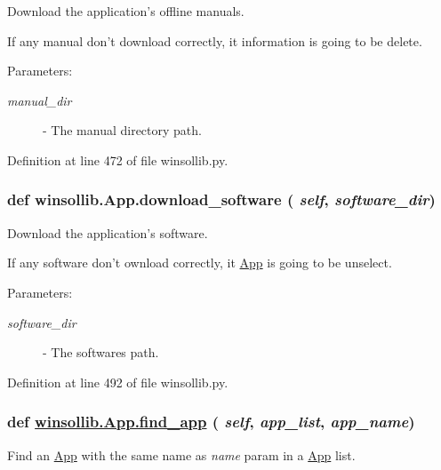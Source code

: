 Download the application's offline manuals. 

If any manual don't download correctly, it information is going to be delete. \begin{Desc}
\item[Parameters:]
\begin{description}
\item[{\em manual\_\-dir}]- The manual directory path. \end{description}
\end{Desc}


Definition at line 472 of file winsollib.py.\hypertarget{classwinsollib_1_1App_61771bfbd935b893fd056b8f77063932}{
\subsubsection[download\_\-software]{\setlength{\rightskip}{0pt plus 5cm}def winsollib.App.download\_\-software ( {\em self},  {\em software\_\-dir})}}
\label{classwinsollib_1_1App_61771bfbd935b893fd056b8f77063932}


Download the application's software. 

If any software don't ownload correctly, it \hyperlink{classwinsollib_1_1App}{App} is going to be unselect. \begin{Desc}
\item[Parameters:]
\begin{description}
\item[{\em software\_\-dir}]- The softwares path. \end{description}
\end{Desc}


Definition at line 492 of file winsollib.py.\hypertarget{classwinsollib_1_1App_dc394b817be76e77e60d01a4dd20649d}{
\subsubsection[find\_\-app]{\setlength{\rightskip}{0pt plus 5cm}def \hyperlink{classwinsollib_1_1App_8781b002b53dc32d0d780fa72069def8}{winsollib.App.find\_\-app} ( {\em self},  {\em app\_\-list},  {\em app\_\-name})}}
\label{classwinsollib_1_1App_dc394b817be76e77e60d01a4dd20649d}


Find an \hyperlink{classwinsollib_1_1App}{App} with the same name as {\em name\/} param in a \hyperlink{classwinsollib_1_1App}{App} list. 

